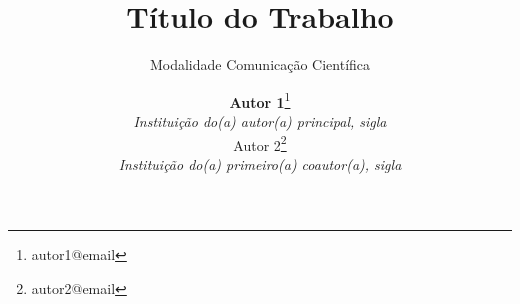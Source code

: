 \documentclass{semat}
\begin{document}

\title{\textbf{Título do Trabalho}}
\subtitle{Modalidade Comunicação Científica} %

\author{
    {\large \textbf {Autor 1}}\thanks{autor1@email}\\ 
    {\small \textit{Instituição do(a) autor(a) principal, sigla}} \\
    {\large Autor 2}\thanks{autor2@email}\\
    {\small \textit{Instituição do(a) primeiro(a) coautor(a), sigla}} 
}
\criartitulo

\end{document}
